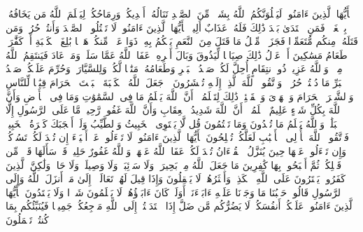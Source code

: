 \stopbuffer
\startbuffer[\q:5:94]
یَٰۤأَیُّهَا ٱلَّذِینَ ءَامَنُوا۟ لَیَبۡلُوَنَّكُمُ ٱللَّهُ بِشَیۡءࣲ مِّنَ ٱلصَّیۡدِ تَنَالُهُۥۤ أَیۡدِیكُمۡ وَرِمَاحُكُمۡ لِیَعۡلَمَ ٱللَّهُ مَن یَخَافُهُۥ بِٱلۡغَیۡبِۚ فَمَنِ ٱعۡتَدَىٰ بَعۡدَ ذَٰلِكَ فَلَهُۥ عَذَابٌ أَلِیمࣱ%
\stopbuffer
\startbuffer[\q:5:95]
یَٰۤأَیُّهَا ٱلَّذِینَ ءَامَنُوا۟ لَا تَقۡتُلُوا۟ ٱلصَّیۡدَ وَأَنتُمۡ حُرُمࣱۚ وَمَن قَتَلَهُۥ مِنكُم مُّتَعَمِّدࣰا فَجَزَاۤءࣱ مِّثۡلُ مَا قَتَلَ مِنَ ٱلنَّعَمِ یَحۡكُمُ بِهِۦ ذَوَا عَدۡلࣲ مِّنكُمۡ هَدۡیَۢا بَٰلِغَ ٱلۡكَعۡبَةِ أَوۡ كَفَّٰرَةࣱ طَعَامُ مَسَٰكِینَ أَوۡ عَدۡلُ ذَٰلِكَ صِیَامࣰا لِّیَذُوقَ وَبَالَ أَمۡرِهِۦۗ عَفَا ٱللَّهُ عَمَّا سَلَفَۚ وَمَنۡ عَادَ فَیَنتَقِمُ ٱللَّهُ مِنۡهُۚ وَٱللَّهُ عَزِیزࣱ ذُو ٱنتِقَامٍ%
\stopbuffer
\startbuffer[\q:5:96]
أُحِلَّ لَكُمۡ صَیۡدُ ٱلۡبَحۡرِ وَطَعَامُهُۥ مَتَٰعࣰا لَّكُمۡ وَلِلسَّیَّارَةِۖ وَحُرِّمَ عَلَیۡكُمۡ صَیۡدُ ٱلۡبَرِّ مَا دُمۡتُمۡ حُرُمࣰاۗ وَٱتَّقُوا۟ ٱللَّهَ ٱلَّذِیۤ إِلَیۡهِ تُحۡشَرُونَ%
\stopbuffer
\startbuffer[\q:5:97]
۞ جَعَلَ ٱللَّهُ ٱلۡكَعۡبَةَ ٱلۡبَیۡتَ ٱلۡحَرَامَ قِیَٰمࣰا لِّلنَّاسِ وَٱلشَّهۡرَ ٱلۡحَرَامَ وَٱلۡهَدۡیَ وَٱلۡقَلَٰۤئِدَۚ ذَٰلِكَ لِتَعۡلَمُوۤا۟ أَنَّ ٱللَّهَ یَعۡلَمُ مَا فِی ٱلسَّمَٰوَٰتِ وَمَا فِی ٱلۡأَرۡضِ وَأَنَّ ٱللَّهَ بِكُلِّ شَیۡءٍ عَلِیمٌ%
\stopbuffer
\startbuffer[\q:5:98]
ٱعۡلَمُوۤا۟ أَنَّ ٱللَّهَ شَدِیدُ ٱلۡعِقَابِ وَأَنَّ ٱللَّهَ غَفُورࣱ رَّحِیمࣱ%
\stopbuffer
\startbuffer[\q:5:99]
مَّا عَلَى ٱلرَّسُولِ إِلَّا ٱلۡبَلَٰغُۗ وَٱللَّهُ یَعۡلَمُ مَا تُبۡدُونَ وَمَا تَكۡتُمُونَ%
\stopbuffer
\startbuffer[\q:5:100]
قُل لَّا یَسۡتَوِی ٱلۡخَبِیثُ وَٱلطَّیِّبُ وَلَوۡ أَعۡجَبَكَ كَثۡرَةُ ٱلۡخَبِیثِۚ فَٱتَّقُوا۟ ٱللَّهَ یَٰۤأُو۟لِی ٱلۡأَلۡبَٰبِ لَعَلَّكُمۡ تُفۡلِحُونَ%
\stopbuffer
\startbuffer[\q:5:101]
یَٰۤأَیُّهَا ٱلَّذِینَ ءَامَنُوا۟ لَا تَسۡءَلُوا۟ عَنۡ أَشۡیَاۤءَ إِن تُبۡدَ لَكُمۡ تَسُؤۡكُمۡ وَإِن تَسۡءَلُوا۟ عَنۡهَا حِینَ یُنَزَّلُ ٱلۡقُرۡءَانُ تُبۡدَ لَكُمۡ عَفَا ٱللَّهُ عَنۡهَاۗ وَٱللَّهُ غَفُورٌ حَلِیمࣱ%
\stopbuffer
\startbuffer[\q:5:102]
قَدۡ سَأَلَهَا قَوۡمࣱ مِّن قَبۡلِكُمۡ ثُمَّ أَصۡبَحُوا۟ بِهَا كَٰفِرِینَ%
\stopbuffer
\startbuffer[\q:5:103]
مَا جَعَلَ ٱللَّهُ مِنۢ بَحِیرَةࣲ وَلَا سَاۤئِبَةࣲ وَلَا وَصِیلَةࣲ وَلَا حَامࣲ وَلَٰكِنَّ ٱلَّذِینَ كَفَرُوا۟ یَفۡتَرُونَ عَلَى ٱللَّهِ ٱلۡكَذِبَۖ وَأَكۡثَرُهُمۡ لَا یَعۡقِلُونَ%
\stopbuffer
\startbuffer[\q:5:104]
وَإِذَا قِیلَ لَهُمۡ تَعَالَوۡا۟ إِلَىٰ مَاۤ أَنزَلَ ٱللَّهُ وَإِلَى ٱلرَّسُولِ قَالُوا۟ حَسۡبُنَا مَا وَجَدۡنَا عَلَیۡهِ ءَابَاۤءَنَاۤۚ أَوَلَوۡ كَانَ ءَابَاۤؤُهُمۡ لَا یَعۡلَمُونَ شَیۡءࣰا وَلَا یَهۡتَدُونَ%
\stopbuffer
\startbuffer[\q:5:105]
یَٰۤأَیُّهَا ٱلَّذِینَ ءَامَنُوا۟ عَلَیۡكُمۡ أَنفُسَكُمۡۖ لَا یَضُرُّكُم مَّن ضَلَّ إِذَا ٱهۡتَدَیۡتُمۡۚ إِلَى ٱللَّهِ مَرۡجِعُكُمۡ جَمِیعࣰا فَیُنَبِّئُكُم بِمَا كُنتُمۡ تَعۡمَلُونَ%
